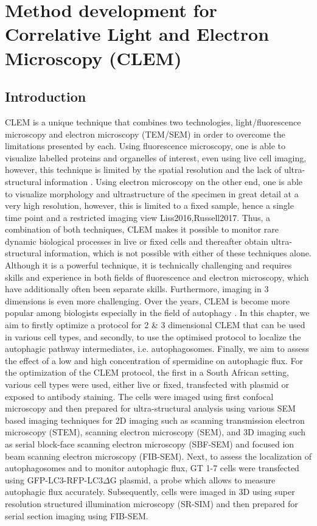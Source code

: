\chapter{Method development for Correlative Light and Electron Microscopy (CLEM)}
\section{Introduction}
CLEM is a unique technique that combines two technologies, light/fluorescence microscopy and electron microscopy (TEM/SEM) in order to overcome the limitations presented by each. Using fluorescence microscopy, one is able to visualize labelled proteins and organelles of interest, even using live cell imaging, however, this technique is limited by the spatial resolution and the lack of ultra-structural information \citep{Russell2017}. Using electron microscopy on the other end, one is able to visualize morphology and ultrastructure of the specimen in great detail at a very high resolution, however, this is limited to a fixed sample, hence a single time point and a restricted imaging view {Liss2016,Russell2017}. Thus, a combination of both techniques, CLEM makes it possible to monitor rare dynamic biological processes in live or fixed cells and thereafter obtain ultra-structural information, which is not possible with either of these techniques alone. Although it is a powerful technique, it is technically challenging and requires skills and experience in both fields of fluorescence and electron microscopy, which have additionally often been separate skills. Furthermore, imaging in 3 dimensions is even more challenging. Over the years, CLEM is become more popular among biologists especially in the field of autophagy \citep{Duke2014,Hosseini2014, Russell2017,Gudmundsson2019}. In this chapter, we aim to firstly optimize a protocol for 2 \& 3 dimensional CLEM that can be used in various cell types, and secondly, to use the optimised protocol to localize the autophagic pathway intermediates, i.e. autophagosomes. Finally, we aim to assess the effect of a low and high concentration of spermidine on autophagic flux. For the optimization of the CLEM protocol, the first in a South African setting, various cell types were used, either live or fixed, transfected with plasmid or exposed to antibody staining. The cells were imaged using first confocal microscopy and then prepared for ultra-structural analysis using various SEM based imaging techniques for 2D imaging such as scanning transmission electron microscopy (STEM), scanning electron microscopy (SEM), and 3D imaging such as serial block-face scanning electron microscopy (SBF-SEM) and focused ion beam scanning electron microscopy (FIB-SEM). Next, to assess the localization of autophagosomes and to monitor autophagic flux, GT 1-7 cells were transfected using GFP-LC3-RFP-LC3$\Delta$G plasmid, a probe which allows to measure autophagic flux accurately. Subsequently, cells were imaged in 3D using super resolution structured illumination microscopy (SR-SIM) and then prepared for serial section imaging using FIB-SEM. 

